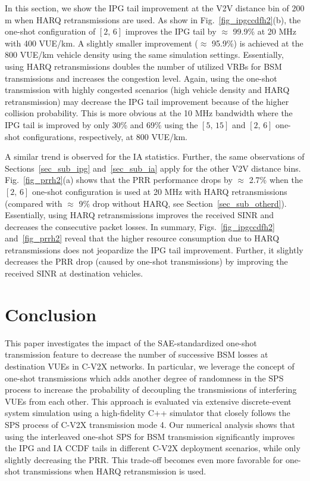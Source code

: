 \documentclass[conference]{IEEEtran}
\begin{document}
In this section, we show the IPG tail improvement at the V2V distance bin of 200 m when HARQ retransmissions are used. As show in Fig.~\ref{fig_ipgccdfh2}(b), the one-shot configuration of $[2,\,6]$ improves the IPG tail by $\approx$ 99.9\% at 20 MHz with 400 VUE/km. A slightly smaller improvement ($\approx$ 95.9\%) is achieved at the 800 VUE/km vehicle density using the same simulation settings. Essentially, using HARQ retransmissions doubles the number of utilized VRBs for BSM transmissions and increases the congestion level. Again, using the one-shot transmission with highly congested scenarios (high vehicle density and HARQ retransmission) may decrease the IPG tail improvement because of the higher collision probability. This is more obvious at the 10 MHz bandwidth where the IPG tail is improved by only 30\% and 69\% using the $[5,\,15]$ and $[2,\,6]$ one-shot configurations, respectively, at 800 VUE/km. 

A similar trend is observed for the IA statistics. Further, the same observations of Sections~\ref{sec_sub_ipg} and~\ref{sec_sub_ia} apply for the other V2V distance bins. Fig.~\ref{fig_prrh2}(a) shows that the PRR performance drops by $\approx$ 2.7\% when the $[2,\,6]$ one-shot configuration is used at 20 MHz with HARQ retransmissions (compared with $\approx$ 9\% drop without HARQ, see Section~\ref{sec_sub_otherd}). Essentially, using HARQ retransmissions improves the received SINR and decreases the consecutive packet losses. In summary, Figs.~\ref{fig_ipgccdfh2} and~\ref{fig_prrh2} reveal that the higher resource consumption due to HARQ retransmissions does not jeopardize the IPG tail improvement. Further, it slightly decreases the PRR drop (caused by one-shot transmissions) by improving the received SINR at destination vehicles.  

\section{Conclusion}\label{sec_conc}
This paper investigates the impact of the SAE-standardized one-shot transmission feature to decrease the number of successive BSM losses at destination VUEs in C-V2X networks. In particular, we leverage the concept of one-shot transmissions which adds another degree of randomness in the SPS process to increase the probability of decoupling the transmissions of interfering VUEs from each other. This approach is evaluated via extensive discrete-event system simulation using a high-fidelity C++ simulator that closely follows the SPS process of C-V2X transmission mode 4. Our numerical analysis shows that using the interleaved one-shot SPS for BSM transmission significantly improves the IPG and IA CCDF tails in different C-V2X deployment scenarios, while only slightly decreasing the PRR. This trade-off becomes even more favorable for one-shot transmissions when HARQ retransmission is used. 
\balance


\end{document}
